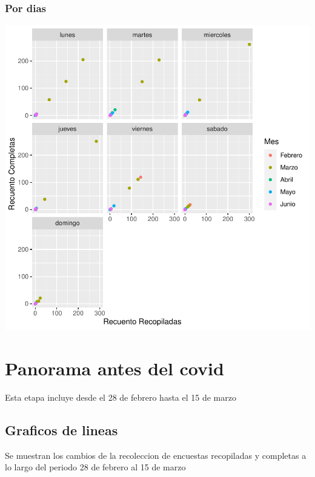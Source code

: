 \documentclass{article}
\begin{document}
\subsubsection{Por dias}

\includegraphics{seguimento2-016}

\section{Panorama antes del covid}
Esta etapa incluye desde el 28 de febrero hasta el 15 de marzo

\subsection{Graficos de lineas}
Se muestran los cambios de la recoleccion de encuestas recopiladas y completas a lo largo del periodo 28 de febrero al 15 de marzo
\end{document}
